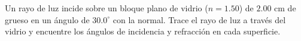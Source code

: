 \item Un rayo de luz incide sobre un bloque plano de vidrio ($n = 1.50$) de $2.00\text{ cm}$ de grueso en un ángulo de $30.0^\circ$ con la normal. Trace el rayo de luz a través del vidrio y encuentre los ángulos de incidencia y refracción en cada superficie.